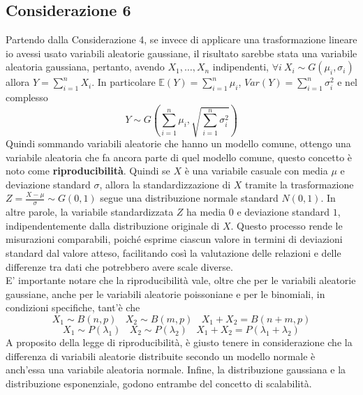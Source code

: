 \documentclass[11pt]{report}
\begin{document}
\subsection{Considerazione 6}
Partendo dalla Considerazione 4, se invece di applicare una trasformazione lineare io avessi usato variabili aleatorie gaussiane, il risultato sarebbe stata una variabile aleatoria gaussiana, pertanto, avendo $X_1, \dots, X_n$ indipendenti, $\forall i\ X_i \sim G(\mu_i, \sigma_i)$ allora $Y = \sum_{i=1}^n X_i$. In particolare $\mathbb{E}(Y) = \sum_{i=1}^n \mu_i$, $Var(Y) = \sum_{i=1}^n \sigma_i^2$ e nel complesso
\begin{equation}
    Y \sim G \left( \sum_{i=1}^n \mu_i, \sqrt{\sum_{i=1}^n \sigma_i^2} \right)
\end{equation}
Quindi sommando variabili aleatorie che hanno un modello comune, ottengo una variabile aleatoria che fa ancora parte di quel modello comune, questo concetto è noto come \textbf{riproducibilità}. Quindi se $X$ è una variabile casuale con media $\mu$ e deviazione standard $\sigma$, allora la standardizzazione di $X$ tramite la trasformazione $Z = \frac{X-\mu}{\sigma} \sim G(0,1)$ segue una distribuzione normale standard $N(0,1)$. In altre parole, la variabile standardizzata $Z$ ha media $0$ e deviazione standard $1$, indipendentemente dalla distribuzione originale di $X$. Questo processo rende le misurazioni comparabili, poiché esprime ciascun valore in termini di deviazioni standard dal valore atteso, facilitando così la valutazione delle relazioni e delle differenze tra dati che potrebbero avere scale diverse.\\
E' importante notare che la riproducibilità vale, oltre che per le variabili aleatorie gaussiane, anche per le variabili aleatorie poissoniane e per le binomiali, in condizioni specifiche, tant'è che
\begin{equation}
	X_1 \sim B(n,p)\ \ \ \ X_2 \sim B(m, p)\ \ \ \ X_1 + X_2 = B(n + m, p)
\end{equation}
\begin{equation}
	X_1 \sim P(\lambda_1)\ \ \ \ X_2 \sim P(\lambda_2)\ \ \ \ X_1 + X_2 = P(\lambda_1 + \lambda_2)
\end{equation}
A proposito della legge di riproducibilità, è giusto tenere in considerazione che la differenza di variabili aleatorie distribuite secondo un modello normale è anch'essa una variabile aleatoria normale. Infine, la distribuzione gaussiana e la distribuzione esponenziale, godono entrambe del concetto di scalabilità.
\end{document}

